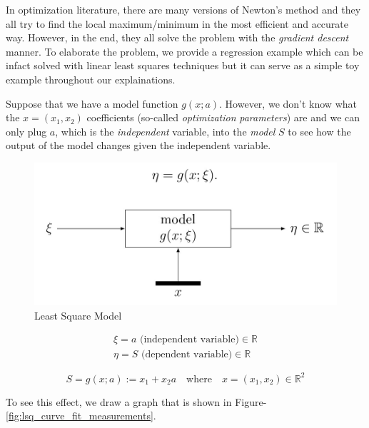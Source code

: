 \documentclass[a4paper]{report}
\numberwithin{figure}{section}
\newcommand{\R}{\mathbb{R}}
\begin{document}
In optimization literature,
there are many versions of Newton's method 
and they all try to find the
local maximum/minimum in the most efficient and accurate way.
However, in the end, they all solve the problem
with the \textit{gradient descent} manner.
To elaborate the problem, we provide a regression example 
which can be infact solved with linear least squares techniques but it can serve 
as a simple toy example throughout our explainations.

Suppose that we have a model function $g(x;a)$. However,
we don't know what the $x=(x_1,x_2)$ coefficients (so-called
\textit{optimization} \textit{parameters}) are and we can only
plug $a$, which is the \textit{independent} variable, into the
\textit{model} $S$ to see
how the output of the model changes given the independent variable. 

\begin{figure}[H]
	\includegraphics[width=0.8\linewidth,natwidth=640,natheight=640]
	{fig/lsq_model.jpg}
	\centering
	\caption{Least Square Model}
	\label{fig:lsq_model}
\end{figure}



\begin{gather}
\xi = a \text{ (independent variable)} \in \R \\
\eta = S \text{ (dependent variable)} \in \R
\label{eq:lsq_model_variables}
\end{gather}

\begin{equation}
S = g(x;a) := x_1 + x_2a \quad 
\text{where} \quad 
x=(x_1,x_2) \in \R^2
\label{eq}
\end{equation}


To see this effect, 
we draw a graph that is shown in
Figure-\ref{fig:lsq_curve_fit_measurements}.
\end{document}
